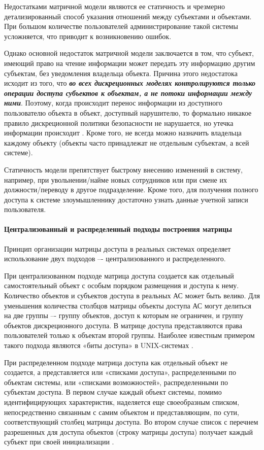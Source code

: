 Недостатками матричной модели являются ее статичность и чрезмерно детализированный способ указания 
отношений между субъектами и объектами. При большом количестве пользователей администрирование такой 
системы усложняется, что приводит к возникновению ошибок.

Однако основной недостаток матричной модели заключается в том, что субъект, имеющий право на чтение 
информации может передать эту информацию другим субъектам, без уведомления владельца объекта. Причина 
этого недостатока исходит из того, что \textbf{\textit{во всех дискреционных моделях контролируются только 
операции доступа субъектов к объектам, а не потоки информации между ними}}. Поэтому, когда происходит 
перенос информации из доступного пользователю объекта в объект, доступный нарушителю, то формально 
никакое правило дискреционной политики безопасности не нарушается, но утечка информации происходит 
\autocite{URFULecture10Models}. Кроме того, не всегда можно назначить владельца каждому объекту 
(объекты часто принадлежат не отдельным субъектам, а всей системе).

Статичность модели препятствует быстрому внесению изменений в систему, например, при увольнении/найме 
новых сотрудников или при смене их должности/переводу в другое подразделение. Кроме того, для получения 
полного доступа к системе злоумышленнику достаточно узнать данные учетной записи пользователя. 

\paragraph{Централизованный и распределенный подходы построения матрицы}

Принцип организации матрицы доступа в реальных системах определяет использование двух подходов –- 
централизованного и распределенного.

При централизованном подходе матрица доступа создается как отдельный самостоятельный объект с особым 
порядком размещения и доступа к нему. Количество объектов и субъектов доступа в реальных АС может быть
велико. Для уменьшения количества столбцов матрицы объекты доступа АС могут делиться на две группы –- 
группу объектов, доступ к которым не ограничен, и группу объектов дискреционного доступа. В матрице 
доступа представляются права пользователей только к объектам второй группы. Наиболее известным примером 
такого подхода являются «биты доступа» в UNIX-системах \autocite{URFULecture10Models}.

При распределенном подходе матрица доступа как отдельный объект не создается, а представляется или 
«списками доступа», распределенными по объектам системы, или «списками возможностей», распределенными 
по субъектам доступа. В первом случае каждый объект системы, помимо идентифицирующих характеристик, 
наделяется еще своеобразным списком, непосредственно связанным с самим объектом и представляющим, 
по сути, соответствующий столбец матрицы доступа. Во втором случае список с перечнем разрешенных для 
доступа объектов (строку матрицы доступа) получает каждый субъект при своей инициализации 
\autocite{URFULecture10Models}.

